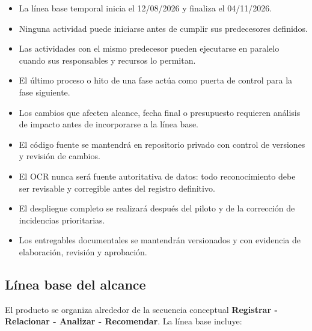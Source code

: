 \documentclass[12pt,a4paper]{article}
\begin{document}
\begin{itemize}
    \item La línea base temporal inicia el 12/08/2026 y finaliza el 04/11/2026.
    \item Ninguna actividad puede iniciarse antes de cumplir sus predecesores definidos.
    \item Las actividades con el mismo predecesor pueden ejecutarse en paralelo cuando sus responsables y recursos lo permitan.
    \item El último proceso o hito de una fase actúa como puerta de control para la fase siguiente.
    \item Los cambios que afecten alcance, fecha final o presupuesto requieren análisis de impacto antes de incorporarse a la línea base.
    \item El código fuente se mantendrá en repositorio privado con control de versiones y revisión de cambios.
    \item El OCR nunca será fuente autoritativa de datos: todo reconocimiento debe ser revisable y corregible antes del registro definitivo.
    \item El despliegue completo se realizará después del piloto y de la corrección de incidencias prioritarias.
    \item Los entregables documentales se mantendrán versionados y con evidencia de elaboración, revisión y aprobación.
\end{itemize}

\subsection{Línea base del alcance}

El producto se organiza alrededor de la secuencia conceptual \textbf{Registrar - Relacionar - Analizar - Recomendar}. La línea base incluye:
\end{document}
